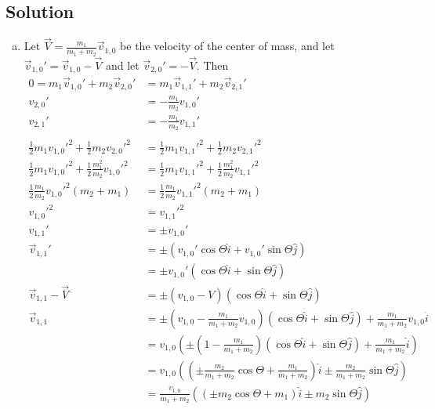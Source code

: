 \documentclass[solutions]{esg8012pset}
\begin{document}
\subsection{Solution}
  \begin{enumerate}[a)]
    \item Let $\vec V = \frac{m_1}{m_1 + m_2}\vec v_{1,0}$ be the velocity of the center of mass, and let $\vec v_{1,0}' = \vec v_{1, 0} - \vec V$ and let $\vec v_{2, 0}' = -\vec V$.  Then \begin{align*}
    0 = m_1\vec v_{1, 0}' + m_2\vec v_{2,0}' & = m_1\vec v_{1, 1}' + m_2\vec v_{2,1}' \\
    v_{2, 0}' & = -\frac{m_1}{m_2} v_{1,0}' \\
    v_{2, 1}' & = -\frac{m_1}{m_2} v_{1,1}' \\
    \\
    \frac{1}{2}m_1 v_{1, 0}'^2 + \frac{1}{2}m_2 v_{2, 0}'^2 & = \frac{1}{2}m_1 v_{1, 1}'^2 + \frac{1}{2}m_2 v_{2, 1}'^2 \\
    \frac{1}{2}m_1 v_{1, 0}'^2 + \frac{1}{2}\frac{m_1^2}{m_2} v_{1,0}'^2 & = \frac{1}{2}m_1 v_{1, 1}'^2 + \frac{1}{2}\frac{m_1^2}{m_2} v_{1,1}'^2 \\
    \frac{1}{2}\frac{m_1}{m_2} v_{1, 0}'^2(m_2 + m_1) & = \frac{1}{2}\frac{m_1}{m_2} v_{1, 1}'^2(m_2 + m_1) \\
    v_{1, 0}'^2 & = v_{1, 1}'^2 \\
    v_{1, 1}' & = \pm v_{1,0}' \\
    \vec v_{1, 1}' & = \pm (v_{1,0}'\cos\Theta\hat i + v_{1,0}'\sin\Theta \hat j) \\
    & = \pm v_{1,0}'(\cos\Theta\hat i + \sin\Theta \hat j) \\
    \vec v_{1, 1} - \vec V & = \pm (v_{1,0} - V)(\cos\Theta\hat i + \sin\Theta \hat j) \\
    \vec v_{1, 1} & = \pm \left(v_{1,0} - \frac{m_1}{m_1 + m_2} v_{1,0}\right)(\cos\Theta\hat i + \sin\Theta \hat j) + \frac{m_1}{m_1 + m_2}v_{1,0}\hat i \\
    & = v_{1,0}\left(\pm \left(1 - \frac{m_1}{m_1 + m_2}\right)(\cos\Theta\hat i + \sin\Theta \hat j) + \frac{m_1}{m_1 + m_2}\hat i\right) \\
    & = v_{1,0}\left(\left(\pm \frac{m_2}{m_1 + m_2}\cos\Theta + \frac{m_1}{m_1 + m_2}\right)\hat i \pm\frac{m_2}{m_1 + m_2} \sin\Theta \hat j\right) \\
    & = \frac{v_{1,0}}{m_1 + m_2}\left((\pm m_2\cos\Theta + m_1)\hat i \pm m_2\sin\Theta \hat j\right)
    \end{align*}

\end{enumerate}
\end{document}
